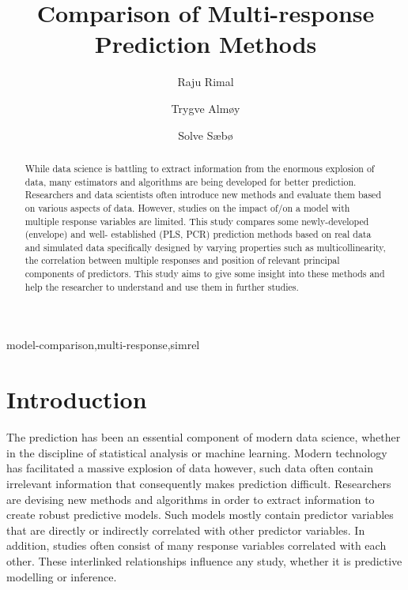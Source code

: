 \documentclass[review]{elsarticle}
\begin{document}
\begin{frontmatter}

  \title{Comparison of Multi-response Prediction Methods}
  
    \author[KBM]{Raju Rimal}
    \author[KBM]{Trygve Almøy}
  
    \author[NMBU]{Solve Sæbø}
  
      \address[KBM]{Faculty of Chemistry and Bioinformatics, Norwegian University of Life Sciences, Ås, Norway}
    \address[NMBU]{Professor, Norwegian University of Life Sciences, Ås, Norway}
  
  \begin{abstract}
  While data science is battling to extract information from the enormous explosion of data, many estimators and algorithms are being developed for better prediction. Researchers and data scientists often introduce new methods and evaluate them based on various aspects of data. However, studies on the impact of/on a model with multiple response variables are limited. This study compares some newly-developed (envelope) and well- established (PLS, PCR) prediction methods based on real data and simulated data specifically designed by varying properties such as multicollinearity, the correlation between multiple responses and position of relevant principal components of predictors. This study aims to give some insight into these methods and help the researcher to understand and use them in further studies.
  \end{abstract}
   \begin{keyword} model-comparison,multi-response,simrel\end{keyword}

\end{frontmatter}

\hypertarget{introduction}{%
\section{Introduction}\label{introduction}}

The prediction has been an essential component of modern data science, whether in the discipline of statistical analysis or machine learning. Modern technology has facilitated a massive explosion of data however, such data often contain irrelevant information that consequently makes prediction difficult. Researchers are devising new methods and algorithms in order to extract information to create robust predictive models. Such models mostly contain predictor variables that are directly or indirectly correlated with other predictor variables. In addition, studies often consist of many response variables correlated with each other. These interlinked relationships influence any study, whether it is predictive modelling or inference.
\end{document}
